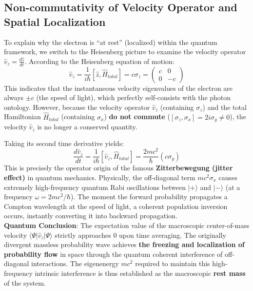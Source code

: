\documentclass[12pt, a4paper]{article}
\begin{document}
\subsection{Non-commutativity of Velocity Operator and Spatial Localization}

To explain why the electron is ``at rest'' (localized) within the quantum framework, we switch to the Heisenberg picture to examine the velocity operator $\hat{v}_z = \frac{d\hat{z}}{dt}$.
According to the Heisenberg equation of motion:
\begin{equation}
    \hat{v}_z = \frac{1}{i\hbar}[\hat{z}, \hat{H}_{total}] = c\sigma_z = \begin{pmatrix} c & 0 \\ 0 & -c \end{pmatrix}
\end{equation}
This indicates that the instantaneous velocity eigenvalues of the electron are always $\pm c$ (the speed of light), which perfectly self-consists with the photon ontology. However, because the velocity operator $\hat{v}_z$ (containing $\sigma_z$) and the total Hamiltonian $\hat{H}_{total}$ (containing $\sigma_x$) \textbf{do not commute} ($[\sigma_z, \sigma_x] = 2i\sigma_y \neq 0$), the velocity $\hat{v}_z$ is no longer a conserved quantity.

Taking its second time derivative yields:
\begin{equation}
    \frac{d\hat{v}_z}{dt} = \frac{1}{i\hbar}[\hat{v}_z, \hat{H}_{total}] = \frac{2mc^2}{\hbar} (c\sigma_y)
\end{equation}
This is precisely the operator origin of the famous \textbf{Zitterbewegung (jitter effect)} in quantum mechanics. 
Physically, the off-diagonal term $mc^2\sigma_x$ causes extremely high-frequency quantum Rabi oscillations between $|+\rangle$ and $|-\rangle$ (at a frequency $\omega = 2mc^2/\hbar$). The moment the forward probability propagates a Compton wavelength at the speed of light, a coherent population inversion occurs, instantly converting it into backward propagation. \\
\textbf{Quantum Conclusion}: The expectation value of the macroscopic center-of-mass velocity $\langle\Psi|\hat{v}_z|\Psi\rangle$ strictly approaches $0$ upon time averaging. The originally divergent massless probability wave achieves \textbf{the freezing and localization of probability flow} in space through the quantum coherent interference of off-diagonal interactions. The eigenenergy $mc^2$ required to maintain this high-frequency intrinsic interference is thus established as the macroscopic \textbf{rest mass} of the system.
\end{document}
